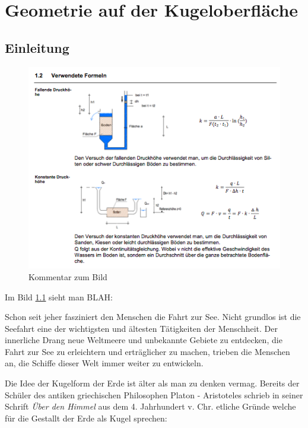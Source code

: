 \chapter{Geometrie auf der Kugeloberfläche\label{chapter:kugel}}
\begin{refsection}


\section{Einleitung}

\begin{figure}
\centering
\includegraphics[width=\hsize]{kugel/Bild.png}
\caption{Kommentar zum Bild
\label{kugel:erstesbild}
}
\end{figure}

Im Bild \ref{kugel:erstesbild} sieht man BLAH:

Schon seit jeher fasziniert den Menschen die Fahrt zur See. Nicht grundlos ist die Seefahrt eine der wichtigsten und ältesten Tätigkeiten der Menschheit. Der innerliche Drang neue Weltmeere und unbekannte Gebiete zu entdecken, die Fahrt zur See zu erleichtern und erträglicher zu machen, trieben die Menschen an, die Schiffe dieser Welt immer weiter zu entwickeln.

Die Idee der Kugelform der Erde ist älter als man zu denken vermag. Bereits der Schüler des antiken griechischen Philosophen Platon - Aristoteles schrieb in seiner Schrift \textit{Über den Himmel} aus dem 4. Jahrhundert v. Chr. etliche Gründe welche für die Gestallt der Erde als Kugel sprechen:


\end{refsection}
